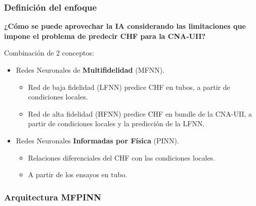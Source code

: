 \documentclass{beamer}
\begin{document}
\begin{frame}
    \frametitle{Definición del enfoque}
    \textbf{¿Cómo se puede aprovechar la IA considerando las limitaciones que impone el problema de predecir CHF para la CNA-UII?}

    \vfill

    Combinación de 2 conceptos:
    \begin{itemize}
        \item Redes Neuronales de \textbf{Multifidelidad} (MFNN). 
        \begin{itemize}
            \item Red de baja fidelidad (LFNN) predice CHF en tubos, a partir de condiciones locales.
            \item Red de alta fidelidad (HFNN) predice CHF en bundle de la CNA-UII, a partir de condiciones locales y la predicción de la LFNN.
        \end{itemize}
        \item Redes Neuronales \textbf{Informadas por Física} (PINN).
        \begin{itemize}
            \item Relaciones diferenciales del CHF con las condiciones locales.
            \item A partir de los ensayos en tubo.
        \end{itemize}
    \end{itemize}
    
\end{frame}

\begin{frame}
    \frametitle{Arquitectura MFPINN}
    \centering
    \resizebox{!}{0.82\textheight}{
        
    }
\end{frame}
\end{document}
